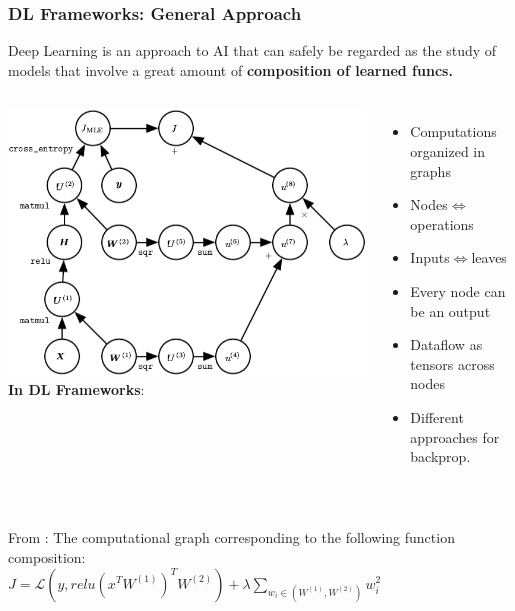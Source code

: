 \documentclass[hyperref={pdfpagelabels=false}]{beamer}
\begin{document}
      \begin{frame}
        \frametitle{DL Frameworks: General Approach}

       \begin{block}{} %
         \small{Deep Learning is an approach to AI that can safely be regarded as the study of models that involve a great amount of \textbf{composition of learned funcs.}\cite[p.8]{goodfellow}}
       \end{block}
       \vspace{2mm}

       \begin{columns}
         \centering
         \includegraphics[scale=0.3]{mlp_graph_220.png}
         \centering
         \textbf{In DL Frameworks}:
         \begin{itemize}[<.->]
         \item \small{Computations organized in graphs}
         \item \small{Nodes$\Leftrightarrow$operations}
         \item \small{Inputs$\Leftrightarrow$leaves}
         \item \small{Every node can be an output}
         \item \small{Dataflow as tensors across nodes}
         \item \small{Different approaches for backprop.}
         \end{itemize}
       \end{columns}

       \begin{center}
         \\\scriptsize{From \cite[220]{goodfellow}: The computational graph corresponding to the following function composition:\\
           $J = \mathcal{L}(y,  relu(x^TW^{(1)})^TW^{(2)}) + \lambda \sum_{w_i \in(W^{(1)}, W^{(2)})} {w_i^2} $ } 
       \end{center}
     \end{frame}
\end{document}
